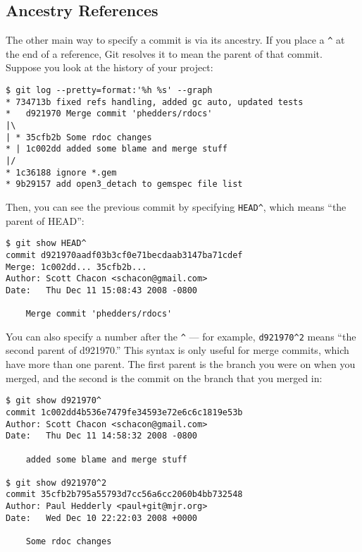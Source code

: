 \documentclass[a4paper]{book}
\begin{document}
\subsection{Ancestry References}\label{ancestry-references}

The other main way to specify a commit is via its ancestry. If you place a \texttt{\^{}} at the end of a reference, Git resolves it to mean the parent of that commit. Suppose you look at the history of your project:

\begin{shaded}\begin{verbatim}
$ git log --pretty=format:'%h %s' --graph
* 734713b fixed refs handling, added gc auto, updated tests
*   d921970 Merge commit 'phedders/rdocs'
|\
| * 35cfb2b Some rdoc changes
* | 1c002dd added some blame and merge stuff
|/
* 1c36188 ignore *.gem
* 9b29157 add open3_detach to gemspec file list
\end{verbatim}\end{shaded}

Then, you can see the previous commit by specifying \texttt{HEAD\^{}}, which means “the parent of HEAD”:

\begin{shaded}\begin{verbatim}
$ git show HEAD^
commit d921970aadf03b3cf0e71becdaab3147ba71cdef
Merge: 1c002dd... 35cfb2b...
Author: Scott Chacon <schacon@gmail.com>
Date:   Thu Dec 11 15:08:43 2008 -0800

    Merge commit 'phedders/rdocs'
\end{verbatim}\end{shaded}

You can also specify a number after the \texttt{\^{}} --- for example, \texttt{d921970\^{}2} means “the second parent of d921970.” This syntax is only useful for merge commits, which have more than one parent. The first parent is the branch you were on when you merged, and the second is the commit on the branch that you merged in:

\begin{shaded}\begin{verbatim}
$ git show d921970^
commit 1c002dd4b536e7479fe34593e72e6c6c1819e53b
Author: Scott Chacon <schacon@gmail.com>
Date:   Thu Dec 11 14:58:32 2008 -0800

    added some blame and merge stuff

$ git show d921970^2
commit 35cfb2b795a55793d7cc56a6cc2060b4bb732548
Author: Paul Hedderly <paul+git@mjr.org>
Date:   Wed Dec 10 22:22:03 2008 +0000

    Some rdoc changes
\end{verbatim}\end{shaded}
\end{document}
